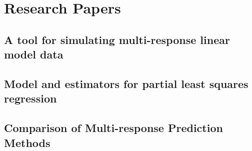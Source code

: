 \documentclass[11pt,a4paper,oneside,openright,titlepage,
  headinclude,footinclude,BCOR5mm,
  numbers=noenddot,cleardoublepage=empty,
  tablecaptionabove, dottedtoc,
  bibliography=totoc]{scrreprt}
\begin{document}
\part*{Research Papers}
\par\chapter{A tool for simulating multi-response linear model data}

\par\chapter{Model and estimators for partial least squares regression}

\par\chapter{Comparison of Multi-response Prediction Methods}

% 
% 
% 

\end{document}
